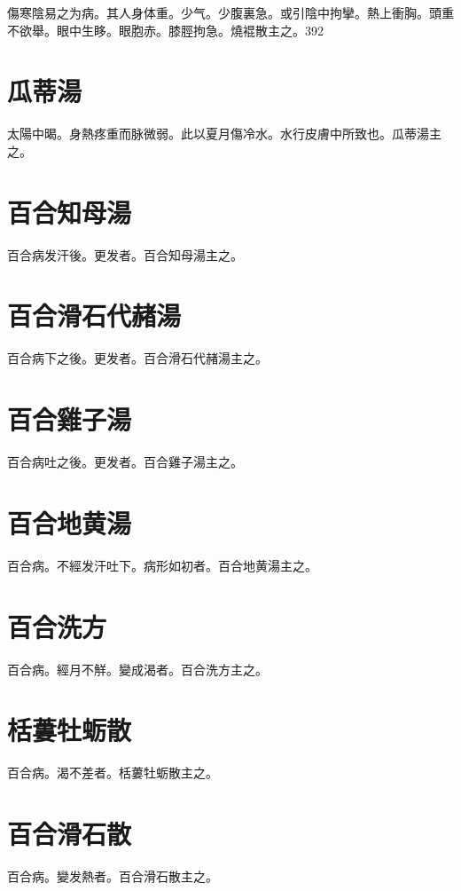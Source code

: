 \documentclass[12pt,twoside,UTF8,b5paper]{ctexbook}
\begin{document}
傷寒陰易之为病。其人身体重。少气。少腹裏急。或引陰中拘攣。熱上衝胸。頭重不欲舉。眼中生眵。{眼胞赤。}膝脛拘急。燒裩散主之。392

\section{瓜蒂湯}

太陽中暍。身熱疼重而脉微弱。此以夏月傷冷水。水行皮膚中所致也。瓜蒂湯主之。

\section{百合知母湯}

百合病发汗後。更发者。百合知母湯主之。

\section{百合滑石代赭湯}

百合病下之後。更发者。百合滑石代赭湯主之。

\section{百合雞子湯}

百合病吐之後。更发者。百合雞子湯主之。

\section{百合地黄湯}

百合病。不經发汗吐下。病形如初者。百合地黄湯主之。

\section{百合洗方}

百合病。經月不觧。變成渴者。百合洗方主之。

\section{栝蔞牡蛎散}

百合病。渴不差者。栝蔞牡蛎散主之。

\section{百合滑石散}

百合病。變发熱者。百合滑石散主之。
\end{document}
